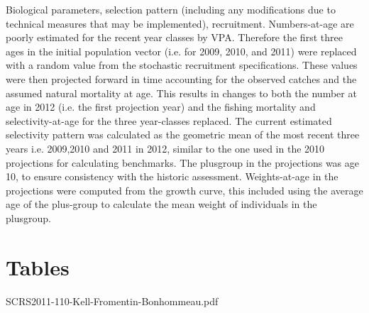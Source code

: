 \documentclass[a4paper,10pt]{article}
\begin{document}
Biological parameters, selection pattern (including any modifications due to technical measures 
that may be implemented), recruitment. Numbers-at-age are poorly estimated for the recent year classes by VPA. Therefore 
the first three ages in the initial population vector (i.e. for 2009, 2010, and 2011) were replaced with a random value 
from the stochastic recruitment specifications. These values were then projected forward in time accounting for the observed catches and the 
assumed natural mortality at age. This results in changes to both the number at age in 2012 (i.e. the first projection year) and the fishing 
mortality and selectivity-at-age for the three year-classes replaced. The current estimated selectivity pattern was 
calculated as the geometric mean of the most recent three years i.e.  2009,2010 and 2011 in 2012, 
similar to the one used in the 2010 projections for calculating benchmarks.
The plusgroup in the projections was age 10, to ensure consistency with the historic assessment. Weights-at-age in the 
projections were computed from the growth curve, this included using the average age of the plus-group to calculate the 
mean weight of individuals in the plusgroup.


\newpage\clearpage
 
 


\newpage
\section{Tables}
\clearpage
  
  
  SCRS2011-110-Kell-Fromentin-Bonhommeau.pdf
  
\end{document}
